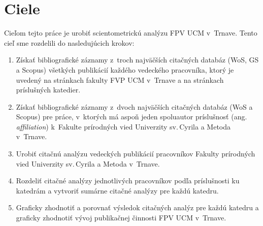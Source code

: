 \chapter{Ciele}

Cieľom tejto práce je urobiť scientometrickú analýzu FPV UCM v~Trnave.  Tento
cieľ sme rozdelili do nasledujúcich krokov:

\begin{enumerate}
\item Získať bibliografické záznamy z~troch najväčších citačných databáz (WoS,
  GS a Scopus) všetkých publikácií každého vedeckého pracovníka, ktorý je
  uvedený na stránkach fakulty FVP UCM v~Trnave a na stránkach príslušných
  katedier.
\item Získať bibliografické záznamy z~dvoch najväčších citačných databáz (WoS a
  Scopus) pre práce, v~ktorých má aspoň jeden spoluautor príslušnosť
  (ang.\,\emph{affiliation}) k~Fakulte prírodných vied Univerzity sv.\,Cyrila a
  Metoda v~Trnave.
\item Urobiť citačnú analýzu vedeckých publikácií pracovníkov Fakulty prírodných
  vied Univerzity sv.\,Cyrila a Metoda v~Trnave.
\item Rozdeliť citačné analýzy jednotlivých pracovníkov podľa príslušnosti ku
  katedrám a vytvoriť sumárne citačné analýzy pre každú katedru.
\item Graficky zhodnotiť a porovnať výsledok citačných analýz pre každú katedru
  a graficky zhodnotiť vývoj publikačnej činnosti FPV UCM v~Trnave.
\end{enumerate}


